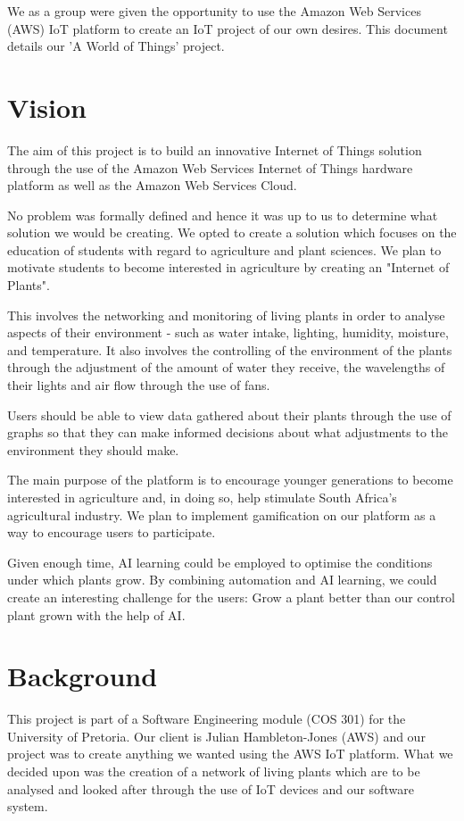 \documentclass{article}
\begin{document}
	We as a group were given the opportunity to use the Amazon Web Services (AWS) IoT platform to create an IoT project of our own desires. This document details our 'A World of Things' project.

\section{Vision}
	The aim of this project is to build an innovative Internet of Things solution through the use of the Amazon Web Services Internet of Things hardware platform as well as the Amazon Web Services Cloud.
	
	No problem was formally defined and hence it was up to us to determine what solution we would be creating. We opted to create a solution which focuses on the education of students with regard to agriculture and plant sciences. We plan to motivate students to become interested in agriculture by creating an "Internet of Plants".
	
	This involves the networking and monitoring of living plants in order to analyse aspects of their environment - such as water intake, lighting, humidity, moisture, and temperature. It also involves the controlling of the environment of the plants through the adjustment of the amount of water they receive, the wavelengths of their lights and air flow through the use of fans.
	
	Users should be able to view data gathered about their plants through the use of graphs so that they can make informed decisions about what adjustments to the environment they should make.
	
	The main purpose of the platform is to encourage younger generations to become interested in agriculture and, in doing so, help stimulate South Africa's agricultural industry. We plan to implement gamification on our platform as a way to encourage users to participate.
	
	Given enough time, AI learning could be employed to optimise the conditions under which plants grow. By combining automation and AI learning, we could create an interesting challenge for the users: Grow a plant better than our control plant grown with the help of AI.

\cleardoublepage

\section{Background}
	This project is part of a Software Engineering module (COS 301) for the University of Pretoria. Our client is Julian Hambleton-Jones (AWS) and our project was to create anything we wanted using the AWS IoT platform. What we decided upon was the creation of a network of living plants which are to be analysed and looked after through the use of IoT devices and our software system.
	
\end{document}

